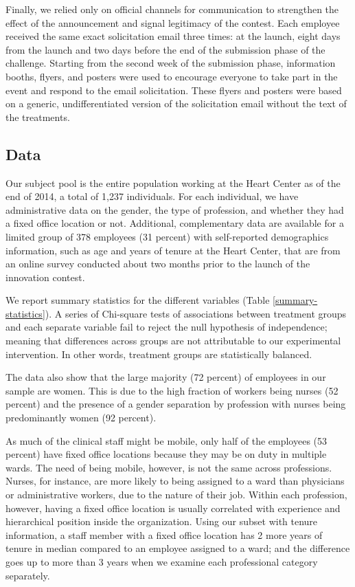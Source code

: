 \documentclass[11pt]{article}
\begin{document}
Finally, we relied only on official channels for communication to
strengthen the effect of the announcement and signal legitimacy of the
contest. Each employee received the same exact solicitation email three
times: at the launch, eight days from the launch and two days before the
end of the submission phase of the challenge. Starting from the second
week of the submission phase, information booths, flyers, and posters
were used to encourage everyone to take part in the event and respond to
the email solicitation. These flyers and posters were based on a
generic, undifferentiated version of the solicitation email without the
text of the treatments.

\subsection{Data}\label{data}

Our subject pool is the entire population working at the Heart Center as
of the end of 2014, a total of 1,237 individuals. For each individual,
we have administrative data on the gender, the type of profession, and
whether they had a fixed office location or not. Additional,
complementary data are available for a limited group of 378 employees
(31 percent) with self-reported demographics information, such as age
and years of tenure at the Heart Center, that are from an online survey
conducted about two months prior to the launch of the innovation
contest.



We report summary statistics for the different variables (Table
\ref{summary-statistics}). A series of Chi-square tests of associations
between treatment groups and each separate variable fail to reject the
null hypothesis of independence; meaning that differences across groups
are not attributable to our experimental intervention. In other words,
treatment groups are statistically balanced.

The data also show that the large majority (72 percent) of employees in
our sample are women. This is due to the high fraction of workers being
nurses (52 percent) and the presence of a gender separation by
profession with nurses being predominantly women (92 percent).

As much of the clinical staff might be mobile, only half of the
employees (53 percent) have fixed office locations because they may be
on duty in multiple wards. The need of being mobile, however, is not the
same across professions. Nurses, for instance, are more likely to being
assigned to a ward than physicians or administrative workers, due to the
nature of their job. Within each profession, however, having a fixed
office location is usually correlated with experience and hierarchical
position inside the organization. Using our subset with tenure
information, a staff member with a fixed office location has 2 more
years of tenure in median compared to an employee assigned to a ward;
and the difference goes up to more than 3 years when we examine each
professional category separately.
\end{document}
